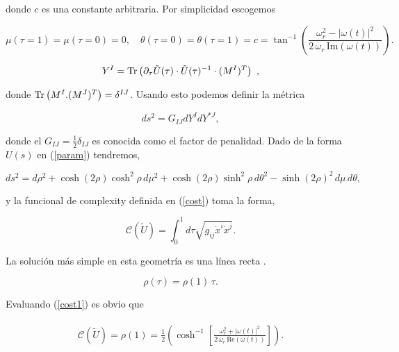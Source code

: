 \documentclass[../Main.tex]{subfiles}
\begin{document}
donde $c$ es una constante arbitraria. Por simplicidad escogemos

\begin{equation}
\mu(\tau=1)=\mu(\tau=0)=0, \quad\theta(\tau=0)=\theta(\tau=1)=c=\tan^{-1}\left(\frac{\omega_r^2-|\omega(t)|^2}{2\,\omega_r\,\text {Im}  (\omega(t))}\right).
\end{equation}



\begin{equation}
Y^{I}=\Tr\left(\partial_{\tau}\tilde U(\tau)\cdot \tilde U(\tau)^{-1}\cdot (M^{I})^{T}\right) \ ,
\end{equation}

donde $\Tr \left(M^{I}. (M^{J})^{T}\right)=\delta^{IJ}$. Usando esto podemos definir la métrica

\begin{equation}
   ds^2= G_{IJ} dY^{I} dY^{* J},
\end{equation}

donde el $G_{IJ}=\frac{1}{2}\delta_{IJ}$ es conocida como el factor de penalidad. Dado de la forma $U(s)$ en (\ref{param}) tendremos,

\begin{equation}
ds^2=d\rho^2+\cosh(2\rho)\cosh^2\rho \,d\mu^2+\cosh(2\rho)\sinh^2\rho\, d\theta^2-\sinh(2\rho)^2\,d\mu\, d\theta,
\end{equation}

y la funcional de complexity definida en (\ref{cost}) toma la forma, 

\begin{equation}
\label{cost1}
\mathcal{C}(\tilde U)=\int_{0}^{1}d\tau \sqrt{g_{ij}\dot x^{i}\dot x^{j}}.
\end{equation}

La solución más simple en esta geometría es una línea recta \citep{Ali_2019}.

\begin{equation}
\rho(\tau)= \rho(1)\, \tau.
\end{equation}

Evaluando (\ref{cost1}) es obvio que 

\begin{align}
\begin{split} \label{answ}
\mathcal{C}(\tilde U)= \rho(1)=\frac{1}{2}\left(\cosh^{-1}\left[\frac{\omega_r^2+|\omega(t)|^2}{2\,\omega_r\,\text {Re}  (\omega(t))}\right]\right) .
\end{split}
\end{align}


\biblio %
\end{document}
